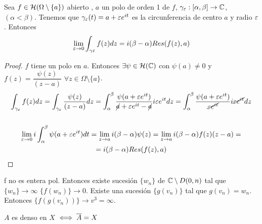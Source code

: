\documentclass[12pt]{article}
\begin{document}
\begin{ejercicio}
        \begin{prop}
            Sea $ f \in \mathcal{H}( \Omega \setminus \{a\})$ abierto , $a$ un polo de orden 1 de $f$, $\gamma_\varepsilon: [\alpha, \beta] \to \mathbb{C}$, $(\alpha<\beta)$. Tenemos que $\gamma_\varepsilon(t) = a + \varepsilon e^{it}$ es la circunferencia de centro $a$ y radio $\varepsilon$. Entonces
            \begin{gather*}
                \lim\limits_{\varepsilon\to 0} \int_{\gamma\varepsilon} f(z) dz = i(\beta-\alpha) Res(f(z),a)
            \end{gather*}
            \begin{proof}
                $f$ tiene un polo en $a$. Entonces $\exists \psi\in \mathcal{H}(\mathbb{C})$ con $\psi(a) \neq 0$ y $f(z)=\dfrac{\psi(z)}{(z-a)}$ $\forall z \in \Omega \setminus \{a\}$.
                \begin{gather*}
                    \int_{\gamma_\varepsilon} f(z) dz = \int_{\gamma_\varepsilon} \frac{\psi(z)}{(z-a)} dz = \int_\alpha^\beta \frac{\psi(a+ \varepsilon e^{it})}{\cancel{a} + \varepsilon e^{it}-\cancel{a}}i\varepsilon e^{it} dz = \int_\alpha^\beta \frac{\psi(a+ \varepsilon e^{it})}{\cancel{\varepsilon e^{it}}}i\cancel{\varepsilon e^{it}} dz\\\\
                    \lim_{\varepsilon \to 0} i\int_\alpha^\beta \psi(a+\varepsilon e^{it}) dt = \lim_{z\to a} i(\beta - \alpha) \psi(z) = \lim_{z\to a } i(\beta - \alpha) f(z) (z-a) =\\= i(\beta - \alpha) Res(f(z),a)
                \end{gather*}
            \end{proof}
        \end{prop}

    \end{ejercicio}
    

    f no es entera pol. Entonces existe sucesión $\{w_n\}$ de $\mathbb{C}\setminus D(0,n)$ tal que $\{w_n\}\to \infty$ $\{f(w_n)\}\to 0$. Existe una sucesión $\{g(v_n)\}$ tal que $g(v_n)=w_n$. Entonces $\{f(g(v_n))\} \to v^3 = \infty$.



    $A$ es denso en $X$ $\iff \overline{A}=X$
\end{document}
